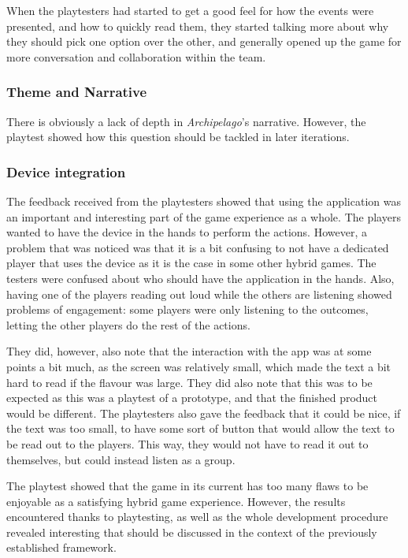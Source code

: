 When the playtesters had started to get a good feel for how the events were presented, and how to quickly read them, they started talking more about why they should pick one option over the other, and generally opened up the game for more conversation and collaboration within the team.

\subsubsection{Theme and Narrative}
There is obviously a lack of depth in \textit{Archipelago}'s narrative. However, the playtest showed how this question should be tackled in later iterations.
\subsubsection{Device integration}
The feedback received from the playtesters showed that using the application was an important and interesting part of the game experience as a whole. The players wanted to have the device in the hands to perform the actions. However, a problem that was noticed was that it is a bit confusing to not have a dedicated player that uses the device as it is the case in some other hybrid games. The testers were confused about who should have the application in the hands. Also, having one of the players reading out loud while the others are listening showed problems of engagement: some players were only listening to the outcomes, letting the other players do the rest of the actions.

They did, however, also note that the interaction with the app was at some points a bit much, as the screen was relatively small, which made the text a bit hard to read if the flavour was large. They did also note that this was to be expected as this was a playtest of a prototype, and that the finished product would be different. The playtesters also gave the feedback that it could be nice, if the text was too small, to have some sort of button that would allow the text to be read out to the players. This way, they would not have to read it out to themselves, but could instead listen as a group.


The playtest showed that the game in its current has too many flaws to be enjoyable as a satisfying hybrid game experience. However, the results encountered thanks to playtesting, as well as the whole development procedure revealed interesting that should be discussed in the context of the previously established framework.
